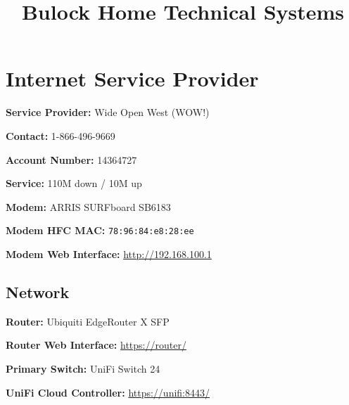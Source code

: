 \documentclass[]{article}
\date{}
\begin{document}

\pretitle{\begin{center}\fontsize{30bp}{30bp}\selectfont}
\posttitle{\par\end{center}}
\title{\color{midgray}\textbf{Bulock Home Technical Systems}}

\maketitle

\tableofcontents



\newpage

\vspace{\baselineskip}\section*{Internet Service Provider}

\textbf{Service Provider: }
{Wide Open West (WOW!)}

\textbf{Contact: }
{1-866-496-9669}

\textbf{Account Number: }
{14364727}

\textbf{Service: }
{110M down / 10M up}

\textbf{Modem: }
{ARRIS SURFboard SB6183}

\textbf{Modem HFC MAC: }
\texttt{78:96:84:e8:28:ee}

\textbf{Modem Web Interface: }
{\href{https://www.google.com/url?q=http://192.168.100.1\&sa=D\&ust=1544293199830000}{http://192.168.100.1}}


\subsection{\texorpdfstring{{Network}}{Network}}

\textbf{Router: }
{Ubiquiti EdgeRouter X SFP}

\textbf{Router Web Interface: }
{\href{https://www.google.com/url?q=https://router/\&sa=D\&ust=1544293199833000}{https://router/}}

\textbf{Primary Switch: }
{UniFi Switch 24}

\textbf{UniFi Cloud Controller: }
{\href{https://www.google.com/url?q=https://unifi:8443/\&sa=D\&ust=1544293199834000}{https://unifi:8443/}}
\end{document}
